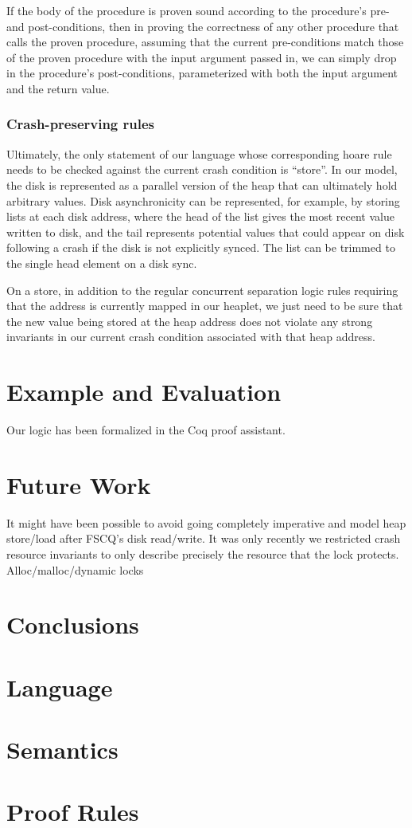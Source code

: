 If the body of the procedure is proven sound according to the procedure's pre-
and post-conditions, then in proving the correctness of any other procedure that calls
the proven procedure, assuming that the current pre-conditions
match those of the proven procedure with the input argument passed in,
we can simply drop in the procedure's post-conditions, parameterized with both
the input argument and the return value.

\subsubsection{Crash-preserving rules}


Ultimately, the only statement of our language whose corresponding hoare rule
needs to be checked against the current crash condition is ``store''. In our
model, the disk is represented as a parallel version of the heap that can
ultimately hold arbitrary values. Disk asynchronicity can be represented, for
example, by storing lists at each disk address, where the head of the list gives
the most recent value written to disk, and the tail represents potential values
that could appear on disk following a crash if the disk is not explicitly synced.
The list can be trimmed to the single head element on a disk sync.

On a store, in addition to the regular concurrent separation logic rules
requiring that the address is currently mapped in our heaplet, we just need to
be sure that the new value being stored at the heap address does not violate any
strong invariants in our current crash condition associated with that heap
address.

\section{Example and Evaluation}

Our logic has been formalized in the Coq proof assistant.

\section{Future Work}


It might have been possible to avoid going completely imperative and model heap
store/load after FSCQ's disk read/write.  It was only recently we restricted
crash resource invariants to only describe precisely the resource that the lock
protects. Alloc/malloc/dynamic locks

\section{Conclusions}

\appendix
\section{Language}
\section{Semantics}
\section{Proof Rules}
